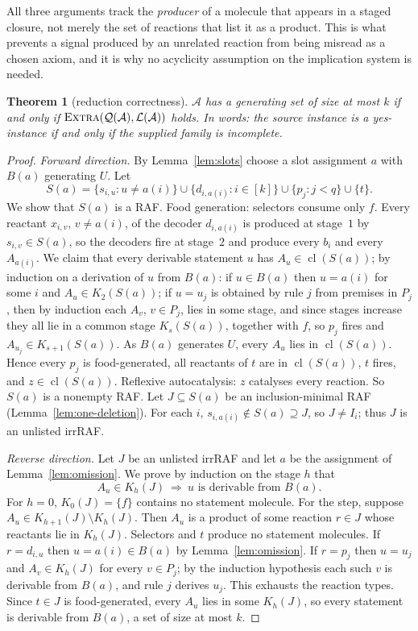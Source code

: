 \documentclass[11pt,a4paper]{article}
\theoremstyle{plain}
\newtheorem{theorem}{Theorem}[section]
\theoremstyle{definition}
\theoremstyle{remark}
\newcommand{\cl}{\operatorname{cl}}
\newcommand{\Extra}{\textup{\textsc{Extra}}}
\newcommand{\cL}{\mathcal{L}}
\newcommand{\cA}{\mathcal{A}}
\newcommand{\cQ}{\mathcal{Q}}
\begin{document}
All three arguments track the \emph{producer} of a molecule that appears in a staged closure, not merely the set of reactions that list it as a product. This is what prevents a signal produced by an unrelated reaction from being misread as a chosen axiom, and it is why no acyclicity assumption on the implication system is needed.

\begin{theorem}[reduction correctness]\label{thm:correct}
$\cA$ has a generating set of size at most $k$ if and only if $\Extra(\cQ(\cA),\cL(\cA))$ holds. In words: the source instance is a yes-instance if and only if the supplied family is incomplete.
\end{theorem}

\begin{proof}
\emph{Forward direction.} By Lemma~\ref{lem:slots} choose a slot assignment $a$ with $B(a)$ generating $U$. Let
\[
S(a)=\{s_{i,u}: u\ne a(i)\}\cup\{d_{i,a(i)}: i\in[k]\}\cup\{p_j: j<q\}\cup\{t\}.
\]
We show that $S(a)$ is a RAF. Food generation: selectors consume only $f$. Every reactant $x_{i,v}$, $v\ne a(i)$, of the decoder $d_{i,a(i)}$ is produced at stage~$1$ by $s_{i,v}\in S(a)$, so the decoders fire at stage~$2$ and produce every $b_i$ and every $A_{a(i)}$. We claim that every derivable statement $u$ has $A_u\in\cl(S(a))$; by induction on a derivation of $u$ from $B(a)$: if $u\in B(a)$ then $u=a(i)$ for some $i$ and $A_u\in K_2(S(a))$; if $u=u_j$ is obtained by rule $j$ from premises in $P_j$, then by induction each $A_v$, $v\in P_j$, lies in some stage, and since stages increase they all lie in a common stage $K_s(S(a))$, together with $f$, so $p_j$ fires and $A_{u_j}\in K_{s+1}(S(a))$. As $B(a)$ generates $U$, every $A_u$ lies in $\cl(S(a))$. Hence every $p_j$ is food-generated, all reactants of $t$ are in $\cl(S(a))$, $t$ fires, and $z\in\cl(S(a))$. Reflexive autocatalysis: $z$ catalyses every reaction. So $S(a)$ is a nonempty RAF. Let $J\subseteq S(a)$ be an inclusion-minimal RAF (Lemma~\ref{lem:one-deletion}). For each $i$, $s_{i,a(i)}\notin S(a)\supseteq J$, so $J\ne I_i$; thus $J$ is an unlisted irrRAF.

\emph{Reverse direction.} Let $J$ be an unlisted irrRAF and let $a$ be the assignment of Lemma~\ref{lem:omission}. We prove by induction on the stage $h$ that
\[
A_u\in K_h(J)\ \Longrightarrow\ u \text{ is derivable from } B(a).
\]
For $h=0$, $K_0(J)=\{f\}$ contains no statement molecule. For the step, suppose $A_u\in K_{h+1}(J)\setminus K_h(J)$. Then $A_u$ is a product of some reaction $r\in J$ whose reactants lie in $K_h(J)$. Selectors and $t$ produce no statement molecules. If $r=d_{i,u}$ then $u=a(i)\in B(a)$ by Lemma~\ref{lem:omission}. If $r=p_j$ then $u=u_j$ and $A_v\in K_h(J)$ for every $v\in P_j$; by the induction hypothesis each such $v$ is derivable from $B(a)$, and rule $j$ derives $u_j$. This exhausts the reaction types. Since $t\in J$ is food-generated, every $A_u$ lies in some $K_h(J)$, so every statement is derivable from $B(a)$, a set of size at most $k$.
\end{proof}
\end{document}
